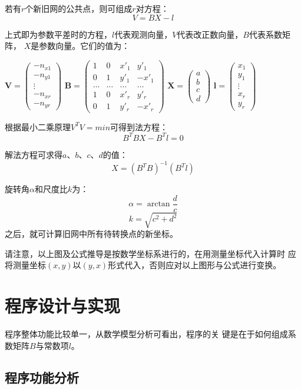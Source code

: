 若有$r$个新旧网的公共点，则可组成$r$对方程：
$$V=BX-l$$

上式即为参数平差时的方程，$l$代表观测向量，$V$代表改正数向量，$B$代表系数矩阵，
$X$是参数向量。它们的值为：

$\mathbf{V}=
\left(\begin{array}{c}
-n_{x1} \\ -n_{y1} \\ \vdots \\ -n_{xr} \\ -n_{yr}
\end{array}\right)$
$\mathbf{B}=
\left(\begin{array}{cccc}
1 & 0 & x'_1 & y'_1 \\
0 & 1 & y'_1 & -x'_1 \\
\dots & \dots & \ldots & \ldots \\
1 & 0 & x'_r & y'_r \\
0 & 1 & y'_r & -x'_r
\end{array}\right)$
$\mathbf{X}=
\left(\begin{array}{c}
a \\ b \\ c \\ d
\end{array}\right)$
$\mathbf{l}=
\left(\begin{array}{c}
x_1 \\ y_1 \\ \vdots \\ x_r \\ y_r
\end{array}\right)$

根据最小二乘原理$V^TV=min$可得到法方程：
$$B^TBX-B^Tl=0$$

解法方程可求得$a$、$b$、$c$、$d$的值：
$$X=(B^TB)^{-1}(B^Tl)$$

旋转角$\alpha$和尺度比$k$为：
$$\alpha=\arctan\frac{d}{c}$$
$$k=\sqrt{c^2+d^2}$$
之后，就可计算旧网中所有待转换点的新坐标。

请注意，以上图及公式推导是按数学坐标系进行的，在用测量坐标代入计算时
应将测量坐标$(x,y)$以$(y,x)$形式代入，否则应对以上图形与公式进行变换。

\section{程序设计与实现}

程序整体功能比较单一，从数学模型分析可看出，程序的关
键是在于如何组成系数矩阵$B$与常数项$l$。

\subsection{程序功能分析}

